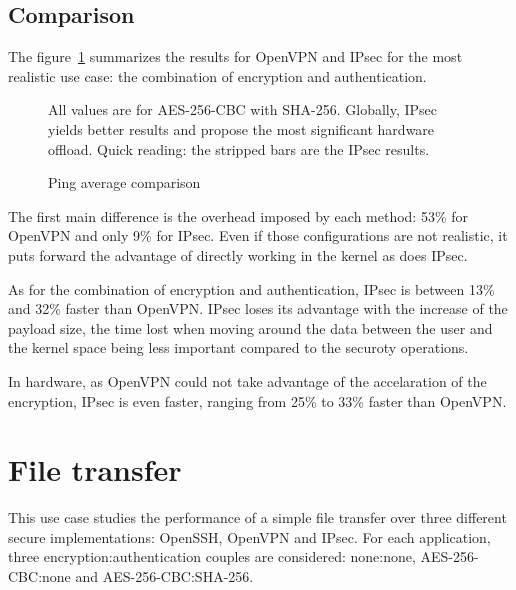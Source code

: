 \subsection{Comparison}
The figure~\ref{fig:ping-benchmark-comparison} summarizes the results for OpenVPN and IPsec for the most realistic use case: the combination of encryption and authentication.

\begin{figure}[ht]

\caption{Ping average comparison}{All values are for AES-256-CBC with SHA-256. Globally, IPsec yields better results and propose the most significant hardware offload. Quick reading: the stripped bars are the IPsec results.}
\label{fig:ping-benchmark-comparison}
\end{figure}

The first main difference is the overhead imposed by each method: 53\% for OpenVPN and only 9\% for IPsec.
Even if those configurations are not realistic, it puts forward the advantage of directly working in the kernel as does IPsec.

As for the combination of encryption and authentication, IPsec is between 13\% and 32\% faster than OpenVPN.
IPsec loses its advantage with the increase of the payload size, the time lost when moving around the data between the user and the kernel space being less important compared to the securoty operations.

\noindent In hardware, as OpenVPN could not take advantage of the accelaration of the encryption, IPsec is even faster, ranging from 25\% to 33\% faster than OpenVPN.














\section{File transfer}

This use case studies the performance of a simple file transfer over three different secure implementations: OpenSSH, OpenVPN and IPsec.
For each application, three encryption:authentication couples are considered: none:none, AES-256-CBC:none and AES-256-CBC:SHA-256. 

